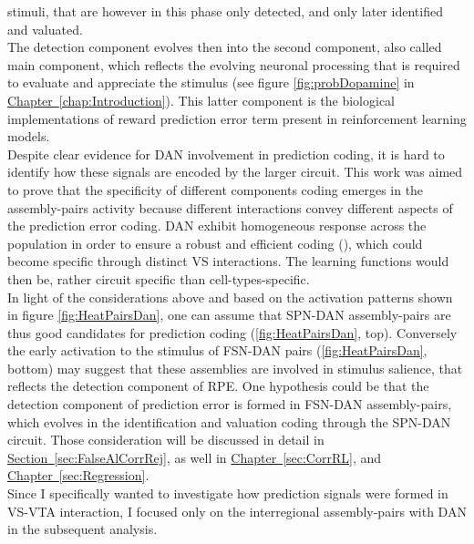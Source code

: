 stimuli, that are however in this phase only detected, and only later identified and valuated.\\The detection component evolves then into the second component, also called main component, which reflects the evolving neuronal processing that is required to evaluate and appreciate the stimulus (see figure \ref{fig:probDopamine} in \hyperref[chap:Introduction]{Chapter~\ref*{chap:Introduction}}). This latter component is the biological implementations of reward prediction error term present in reinforcement learning models.\\Despite clear evidence for DAN involvement in prediction coding, it is hard to identify how these signals are encoded by the larger circuit. This work was aimed to prove that the specificity of different components coding emerges in the assembly-pairs activity because different interactions convey different aspects of the prediction error coding. DAN exhibit homogeneous response across the population in order to ensure a robust and efficient coding (\cite{UchidaDop}), which could become specific through distinct VS interactions. The learning functions would then be, rather circuit specific than cell-types-specific.\\In light of the considerations above and based on the activation patterns shown in figure \ref{fig:HeatPairsDan}, one can assume that SPN-DAN assembly-pairs are thus good candidates for prediction coding (\ref{fig:HeatPairsDan}, top). Conversely the early activation to the stimulus of FSN-DAN pairs (\ref{fig:HeatPairsDan}, bottom) may suggest that these assemblies are involved in stimulus salience, that reflects the detection component of RPE. One hypothesis could be that the detection component of prediction error is formed in FSN-DAN assembly-pairs, which evolves in the identification and valuation coding through the SPN-DAN circuit.
Those consideration will be discussed in detail in \hyperref[sec:FalseAlCorrRej]{Section~\ref*{sec:FalseAlCorrRej}}, as well in \hyperref[sec:CorrRL]{Chapter~\ref*{sec:CorrRL}}, and \hyperref[sec:Regression]{Chapter~\ref*{sec:Regression}}.\\Since I specifically wanted to investigate how prediction signals were formed in VS-VTA interaction, I focused only on the interregional assembly-pairs with DAN in the subsequent analysis.

